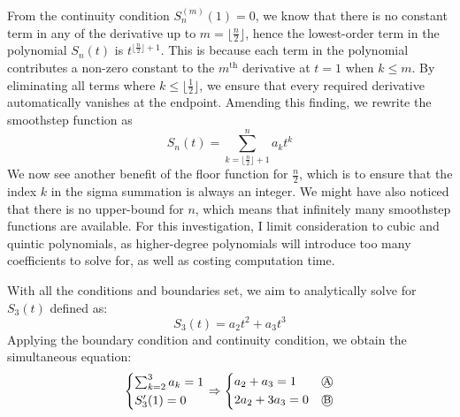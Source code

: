 From the continuity condition $S_n^{(m)}(1)=0$, we know that there is no constant term in any of the derivative up to 
$m=\lfloor\frac{n}{2}\rfloor$, hence the lowest-order term in the polynomial $S_n(t)$ is $t^{\lfloor\frac{n}{2}\rfloor+1}$. This is
because each term in the polynomial contributes a non-zero constant to the $m^{\text{th}}$ derivative at $t=1$ when $k\le m$. By
eliminating all terms where $k\le \lfloor\frac{1}{2}\rfloor$, we ensure that every required derivative automatically vanishes at 
the endpoint. Amending this finding, we rewrite the smoothstep function as
\[S_n(t)=\sum_{k=\lfloor\frac{n}{2}\rfloor+1}^{n}a_kt^k\]
We now see another benefit of the floor function for $\frac{n}{2}$, which is to ensure that the index $k$ in the sigma summation is 
always an integer. We might have also noticed that there is no upper-bound for $n$, which means that infinitely many smoothstep functions 
are available. For this investigation, I limit consideration to cubic and quintic polynomials, as higher-degree polynomials will introduce 
too many coefficients to solve for, as well as costing computation time. 

With all the conditions and boundaries set, we aim to analytically solve for $S_3(t)$ defined as:
\[S_3(t)=a_2t^2+a_3t^3\]
Applying the boundary condition and continuity condition, we obtain the simultaneous equation:
\begin{align}
    \begin{cases*}
        \sum_{k=2}^{3}a_k=1\\
        S_3'(1)=0
    \end{cases*}
    \implies
    \begin{cases*}
        a_2+a_3=1\quad\quad \text{\textcircled{\footnotesize{A}}} \\
        2a_2+3a_3=0\quad \text{\textcircled{\footnotesize{B}}}
    \end{cases*}
\end{align}

